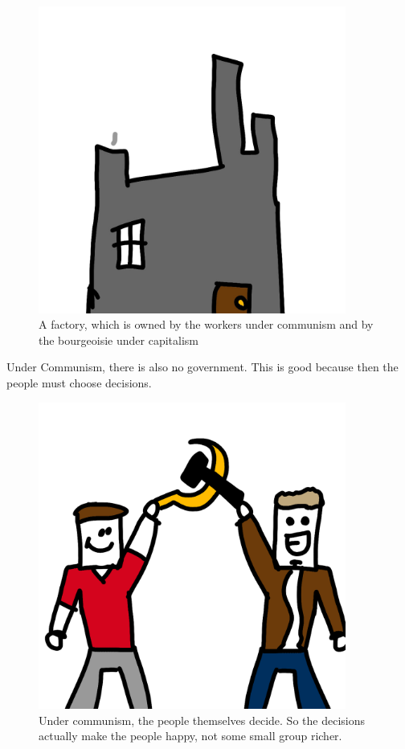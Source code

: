 \documentclass[a4paper]{book}%
\begin{document}
\begin{figure}[tbhp]
\centering
\includegraphics[width=0.9\textwidth]{2-3.png}
\caption{A factory, which is owned by the workers under communism and by the bourgeoisie under capitalism}
\end{figure}

  Under Communism, there is also no government. This is good because then the people must choose decisions.

\begin{figure}[tbhp]
\centering
\includegraphics[width=0.9\textwidth]{2-5.png}
\caption{Under communism, the people themselves decide. So the decisions actually make the people happy, not some small group richer.}
\end{figure}
\end{document}

